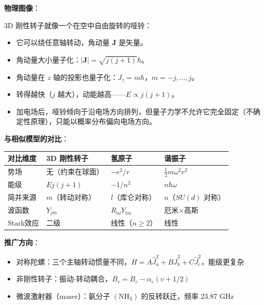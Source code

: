 \begin{insightbox}[物理图像与模型关联]
\textbf{物理图像}：

3D 刚性转子就像一个在空中自由旋转的哑铃：
\begin{itemize}[nosep]
    \item 它可以绕任意轴转动，角动量 $\mathbf{J}$ 是矢量。
    \item 角动量大小量子化：$|\mathbf{J}|=\sqrt{j(j+1)}\hbar$。
    \item 角动量在 $z$ 轴的投影也量子化：$J_z=m\hbar$，$m=-j,\ldots,j$。
    \item 转得越快（$j$ 越大），动能越高——$E\propto j(j+1)$。
    \item 加电场后，哑铃倾向于沿电场方向排列，但量子力学不允许它完全固定（不确定性原理），只能以概率分布偏向电场方向。
\end{itemize}

\textbf{与相似模型的对比}：
\begin{center}
\begin{tabular}{llll}
\toprule
\textbf{对比维度} & \textbf{3D 刚性转子} & \textbf{氢原子} & \textbf{谐振子} \\
\midrule
势场 & 无（约束在球面） & $-e^2/r$ & $\frac12m\omega^2r^2$ \\
能级 & $Ej(j+1)$ & $-1/n^2$ & $n\hbar\omega$ \\
简并来源 & $m$（转动对称） & $l$（库仑对称） & $n$（$SU(d)$ 对称） \\
波函数 & $Y_{jm}$ & $R_{nl}Y_{lm}$ & 厄米$\times$高斯 \\
Stark效应 & 二级 & 线性（$n\geq2$） & 线性 \\
\bottomrule
\end{tabular}
\end{center}

\textbf{推广方向}：
\begin{itemize}[nosep]
    \item 对称陀螺：三个主轴转动惯量不同，$H=A\hat J_a^2+B\hat J_b^2+C\hat J_c^2$，能级更复杂
    \item 非刚性转子：振动-转动耦合，$B_v=B_e-\alpha_e(v+1/2)$
    \item 微波激射器（maser）：氨分子 $(\text{NH}_3)$ 的反转跃迁，频率 23.87 GHz
\end{itemize}
\end{insightbox}

